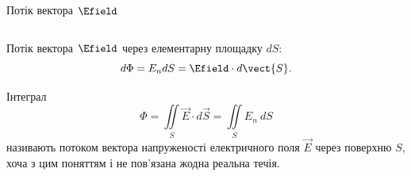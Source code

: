 \documentclass{beamer}
\begin{document}
\begin{frame}{Потік вектора $\Efield$}{}
\begin{columns}
\begin{column}{0.5\linewidth}
		\end{column}
	\end{columns}
	\begin{block}{}\centering\justifying
		Потік вектора $\Efield$ через елементарну площадку $dS$:
		\begin{equation*}
			d\Phi = E_n dS = \Efield\cdot d\vect{S}.
		\end{equation*}
	\end{block}
	\begin{block}{}\justifying\small
		Інтеграл
		\begin{equation*}
			\Phi = 	\iint\limits_S \vec{E}\cdot d\vec{S} = \iint\limits_S E_n\ dS
		\end{equation*}
		називають \alert{потоком вектора напруженості електричного поля} $\vec{E}$ через поверхню
		$S$, хоча з цим поняттям і не пов'язана жодна реальна течія.
	\end{block}
\end{frame}
\end{document}
